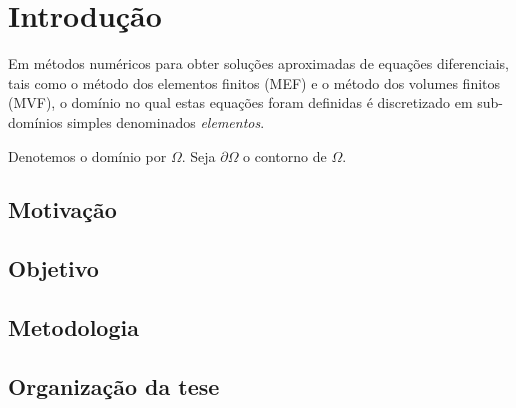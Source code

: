 \chapter{Introdução}

Em métodos numéricos para obter soluções aproximadas de equações diferenciais,
tais como o método dos elementos finitos (MEF) e o método dos volumes finitos (MVF), o domínio no qual estas equações foram definidas é discretizado em
sub-domínios simples denominados \textit{elementos}.

Denotemos o domínio por $\Omega$. Seja $\partial \Omega$ o contorno de
$\Omega$.

\section{Motivaç{\~ a}o}

\section{Objetivo}

\section{Metodologia}

\section{Organizaç{\~ a}o da tese}
